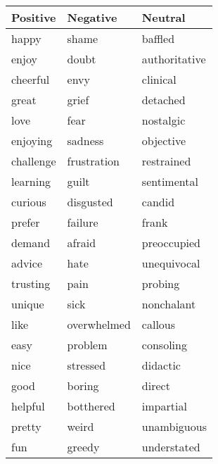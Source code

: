 \documentclass[12pt, oneside]{article}   	%
\begin{document}
\begin{center}
	\begin{tabular}{|P{4cm} |P{4cm}| P{4cm}|}
		
		\hline
		 \vspace{0.1cm}\textbf{ \Large Positive} \vspace{0.5cm}&\vspace{0.1cm} \textbf{ \Large Negative} \vspace{0.1cm}&\vspace{0.1cm} \textbf{ \Large Neutral} \vspace{0.1cm}\\ 		
		\hline
		happy & shame & baffled \\  [8pt]
		\hline
		enjoy & doubt & authoritative \\ [8pt]
		\hline  
		cheerful & envy & clinical \\  [8pt]
		\hline
		great & grief & detached \\ [8pt]
		\hline  
		love & fear & nostalgic \\  [8pt]
		\hline
		enjoying & sadness & objective \\ [8pt]
		\hline  
		challenge & frustration & restrained \\  [8pt]
		\hline
		learning & guilt & sentimental \\ [8pt]
		\hline  
		curious & disgusted & candid \\  [8pt]
		\hline
		prefer & failure & frank \\ [8pt]
		\hline  
		demand & afraid & preoccupied \\  [8pt]
		\hline
		advice & hate & unequivocal \\ [8pt]
		\hline
		trusting & pain & probing \\  [8pt]
		\hline
		unique & sick & nonchalant \\ [8pt]
		\hline  
		like & overwhelmed & callous \\  [8pt]
		\hline
		easy & problem & consoling \\ [8pt]
		\hline  
		nice & stressed & didactic \\  [8pt]
		\hline
		good & boring & direct \\ [8pt]
		\hline  
		helpful & botthered & impartial \\ [8pt]
		\hline  
		pretty & weird & unambiguous \\ [8pt]
		\hline  
		fun & greedy & understated \\ [8pt]
		\hline  
	\end{tabular}
\end{center}
\newpage
\end{document}
